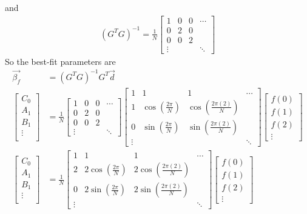 and
\begin{align*}
(G^TG)^{-1} = \frac{1}{N}
\begin{bmatrix}
1 & 0 & 0 & \cdots \\
0 & 2 & 0 & \\
0 & 0 & 2 & \\
\vdots & & & \ddots
\end{bmatrix}    
\end{align*}
So the best-fit parameters are
\begin{align*}
\vec{\beta_f} &= (G^TG)^{-1}G^T\vec{d} \\
\begin{bmatrix}
C_0 \\
A_1 \\
B_1 \\
\vdots \\
\end{bmatrix}
&= \frac{1}{N} 
\begin{bmatrix}
1 & 0 & 0 & \cdots \\
0 & 2 & 0 & \\
0 & 0 & 2 & \\
\vdots & & & \ddots
\end{bmatrix} 
\begin{bmatrix}
1 & 1 & 1 & \cdots \\
1 & \cos(\frac{2\pi}{N}) & \cos(\frac{2\pi(2)}{N}) & \\
0 & \sin(\frac{2\pi}{N}) & \sin(\frac{2\pi(2)}{N}) &  \\
\vdots & & & \ddots
\end{bmatrix}
\begin{bmatrix}
f(0)\\
f(1)\\
f(2)\\
\vdots
\end{bmatrix} \\
\begin{bmatrix}
C_0 \\
A_1 \\
B_1 \\
\vdots \\
\end{bmatrix}
&= 
\frac{1}{N}
\begin{bmatrix}
1 & 1 & 1 & \cdots \\
2 & 2\cos(\frac{2\pi}{N}) & 2\cos(\frac{2\pi(2)}{N}) & \\
0 & 2\sin(\frac{2\pi}{N}) & 2\sin(\frac{2\pi(2)}{N}) &  \\
\vdots & & & \ddots
\end{bmatrix}
\begin{bmatrix}
f(0)\\
f(1)\\
f(2)\\
\vdots
\end{bmatrix} 
\end{align*}
